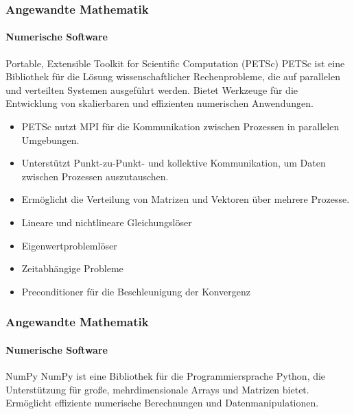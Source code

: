 \documentclass{beamer}
\begin{document}
\begin{frame}
    \frametitle{Angewandte Mathematik}
    \framesubtitle{Numerische Software}
    \begin{block}{Portable, Extensible Toolkit for Scientific Computation (PETSc)}
            PETSc ist eine Bibliothek für die Lösung wissenschaftlicher Rechenprobleme, die auf parallelen und verteilten Systemen ausgeführt werden.
            Bietet Werkzeuge für die Entwicklung von skalierbaren und effizienten numerischen Anwendungen.
            
            \begin{itemize}
                \item PETSc nutzt MPI für die Kommunikation zwischen Prozessen in parallelen Umgebungen.
                \item Unterstützt Punkt-zu-Punkt- und kollektive Kommunikation, um Daten zwischen Prozessen auszutauschen.
                \item Ermöglicht die Verteilung von Matrizen und Vektoren über mehrere Prozesse.
                \item Lineare und nichtlineare Gleichungslöser
                \item Eigenwertproblemlöser
                \item Zeitabhängige Probleme
                \item Preconditioner für die Beschleunigung der Konvergenz
            \end{itemize}
    \end{block}
\end{frame}



\begin{frame}
    \frametitle{Angewandte Mathematik}
    \framesubtitle{Numerische Software}
    \begin{block}{NumPy}
            NumPy ist eine Bibliothek für die Programmiersprache Python, die Unterstützung für große, mehrdimensionale Arrays und Matrizen bietet.
            Ermöglicht effiziente numerische Berechnungen und Datenmanipulationen.
    \end{block}
\end{frame}
\end{document}
